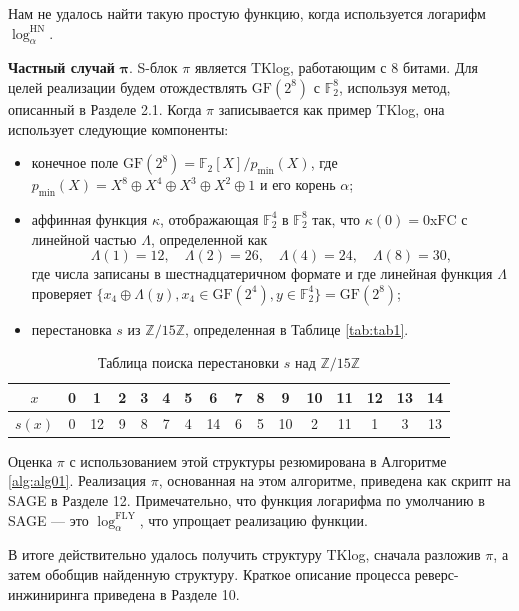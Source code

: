 Нам не удалось найти такую простую функцию, когда используется логарифм \(\log_{\alpha}^{\text{HN}}\).

\textbf{Частный случай} $\bm{\pi}$. S-блок \(\pi\) является TKlog, работающим с 8 битами. Для целей реализации будем отождествлять \(\text{GF}(2^8)\) с \(\mathbb{F}^8_2\), используя метод, описанный в Разделе 2.1. Когда \(\pi\) записывается как пример TKlog, она использует следующие компоненты:

\begin{itemize}
    \item конечное поле \(\text{GF}(2^8) = \mathbb{F}_2[X]/p_{\text{min}}(X)\), где \(p_{\text{min}}(X) = X^8 \oplus X^4 \oplus X^3 \oplus X^2 \oplus 1\) и его корень \(\alpha\);
    \item аффинная функция \(\kappa\), отображающая \(\mathbb{F}^4_2\) в \(\mathbb{F}^8_2\) так, что \(\kappa(0) = 0\)x\(\text{FC}\) с линейной частью \(\Lambda\), определенной как
    \[
    \Lambda(1) = 12, \quad \Lambda(2) = 26, \quad \Lambda(4) = 24, \quad \Lambda(8) = 30,
    \] где числа записаны в шестнадцатеричном формате и где линейная функция \(\Lambda\) проверяет \(\{x_4 \oplus \Lambda(y), x_4 \in \text{GF}(2^4), y \in \mathbb{F}^4_2\} = \text{GF}(2^8)\);
    \item перестановка \(s\) из \(\mathbb{Z}/15\mathbb{Z}\), определенная в Таблице \eqref{tab:tab1}.
\end{itemize}

\begin{table}    
  \caption{Таблица поиска перестановки \(s\) над \(\mathbb{Z}/15\mathbb{Z}\)}
  \begin{tabular}{cccccccccccccccc}
    \hline$x$ & 0 & 1 & 2 & 3 & 4 & 5 & 6 & 7 & 8 & 9 & 10 & 11 & 12 & 13 & 14 \\
    \hline$s(x)$ & 0 & 12 & 9 & 8 & 7 & 4 & 14 & 6 & 5 & 10 & 2 & 11 & 1 & 3 & 13 \\
    \hline
  \end{tabular}
  \label{tab:tab1}
\end{table}

Оценка \(\pi\) с использованием этой структуры резюмирована в Алгоритме \eqref{alg:alg01}. Реализация \(\pi\), основанная на этом алгоритме, приведена как скрипт на SAGE \cite{Dev17} в Разделе 12. Примечательно, что функция логарифма по умолчанию в SAGE — это \(\log_{\alpha}^{\text{FLY}}\), что упрощает реализацию функции.

В итоге действительно удалось получить структуру TKlog, сначала разложив \(\pi\), а затем обобщив найденную структуру. Краткое описание процесса реверс-инжиниринга приведена в Разделе 10.

